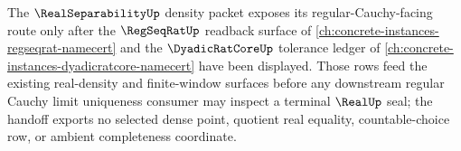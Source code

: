 The $\RealSeparabilityUp$ density packet exposes its regular-Cauchy-facing route only after the $\RegSeqRatUp$ readback surface of \autoref{ch:concrete-instances-regseqrat-namecert} and the $\DyadicRatCoreUp$ tolerance ledger of \autoref{ch:concrete-instances-dyadicratcore-namecert} have been displayed. Those rows feed the existing real-density and finite-window surfaces before any downstream regular Cauchy limit uniqueness consumer may inspect a terminal $\RealUp$ seal; the handoff exports no selected dense point, quotient real equality, countable-choice row, or ambient completeness coordinate.
